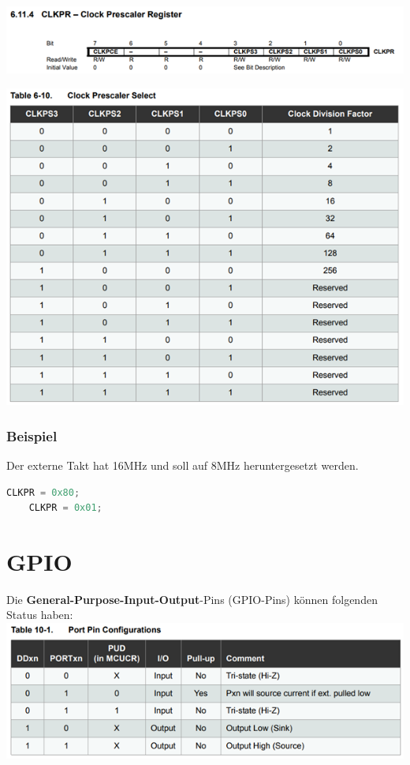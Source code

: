 \vspace{0.5cm}
\includegraphics{Atmega/CLKPR.png}

\vspace{0.5cm}
\includegraphics{Atmega/CLKPR-Table.png}

\newpage

\subsubsection*{Beispiel}
Der externe Takt hat 16MHz und soll auf 8MHz heruntergesetzt werden.
\begin{lstlisting}[language=C]
    CLKPR = 0x80;
    CLKPR = 0x01;
\end{lstlisting}

\section{GPIO}
Die \textbf{General-Purpose-Input-Output}-Pins (GPIO-Pins) können folgenden Status haben:
\includegraphics{Atmega/PortPin-Config.png}

